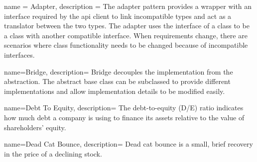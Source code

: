 

{
	name = {Adapter},
	description = {
		The adapter pattern provides a wrapper with an interface
		required by the \gls{api} client to link incompatible types and act as a
		translator between the two types. The adapter uses the interface
		of a class to be a class with another compatible interface. When
		requirements change, there are scenarios where class
		functionality needs to be changed because of incompatible
		interfaces.
	}
}

{
	name={Bridge},
	description={
			Bridge decouples the implementation from the abstraction. The
		abstract base class can be subclassed to provide different
		implementations and allow implementation details to be
		modified easily. 
	}
}



{
	name={Debt To Equity},
	description={
		The debt-to-equity (D/E) ratio indicates how much debt a company is using to finance its assets relative to the value of shareholders' equity.
	}
}

{
	name={Dead Cat Bounce},
	description={
		Dead cat bounce is a small, brief recovery in the price of a declining stock.
	}
}